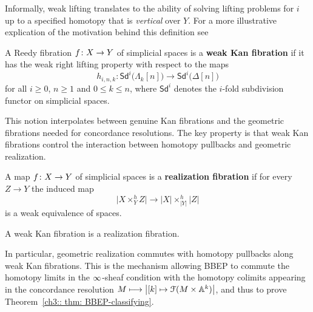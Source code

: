 Informally, weak lifting translates to the ability of solving lifting problems for $i$ up to a specified homotopy that is \emph{vertical} over $Y$. For a more illustrative explication of the motivation behind this definition see \cite[Remark~3.4]{BBEP24}

\begin{definition}\label{ch3:: def: weak-kan-fibration}
  {\cite[Definition~3.8]{BBEP24}}
  A Reedy fibration $f\colon X\to Y$ of simplicial spaces is a
  \textbf{weak Kan fibration} if it has the weak right lifting property with
  respect to the maps
  \[
    h_{i,n,k}\colon
    \mathsf{Sd}^{i}\big(\Lambda_k[n]\big)\longrightarrow
    \mathsf{Sd}^{i}\big(\Delta[n]\big)
  \]
  for all $i\geq 0$, $n\geq1$ and $0\leq k\leq n$, where
  $\mathsf{Sd}^{i}$ denotes the $i$-fold subdivision functor on simplicial
  spaces.
\end{definition}

This notion interpolates between genuine Kan fibrations and the geometric fibrations needed for concordance resolutions. The key property is that weak Kan fibrations control the interaction between homotopy pullbacks and geometric realization.

\begin{definition}\label{ch3:: def: realization-fibration}
  A map $f\colon X\to Y$ of simplicial spaces is a
  \textbf{realization fibration} if for every $Z\to Y$ the induced map
  \begin{equation}
    \big|X\times_Y^{h} Z\big|
      \longrightarrow
    |X|\times_{|Y|}^{h}|Z|
  \end{equation}
  is a weak equivalence of spaces.
\end{definition}

\begin{theorem}\label{ch3:: thm: weak-kan-realization}
  {\cite[Theorem~3.17]{BBEP24}}
  A weak Kan fibration is a realization fibration.
\end{theorem}

In particular, geometric realization commutes with homotopy pullbacks along
weak Kan fibrations. This is the mechanism allowing BBEP to commute the
homotopy limits in the $\operatorname{\infty}$-sheaf condition with the homotopy colimits
appearing in the concordance resolution $M\longmapsto\big|[k]\mapsto\mathcal F(M\times \mathbb A^k)\big|$, and thus to prove Theorem~\ref{ch3:: thm: BBEP-classifying}.


